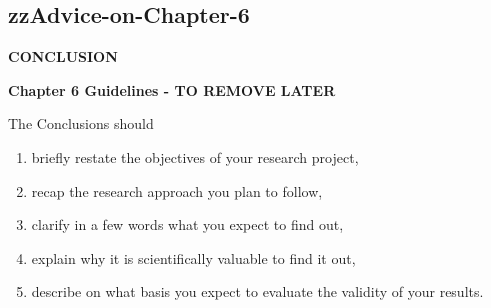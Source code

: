 \pagebreak
\begin{tcolorbox}
	
\section{zzAdvice-on-Chapter-6}

\textbf{CONCLUSION}
\vspace*{1\baselineskip}

\textbf{Chapter 6 Guidelines - TO REMOVE LATER}	
\vspace*{1\baselineskip}
	
The Conclusions should 
	
	\begin{enumerate}
		\item briefly restate the objectives of your research project, 
		\item recap the research approach you plan to follow, 
		\item clarify in a few words what you expect to find out, 
		\item explain why it is scientifically valuable to find it out, 
		\item describe on what basis you expect to evaluate the validity of your results.
	\end{enumerate}
	
\end{tcolorbox}

